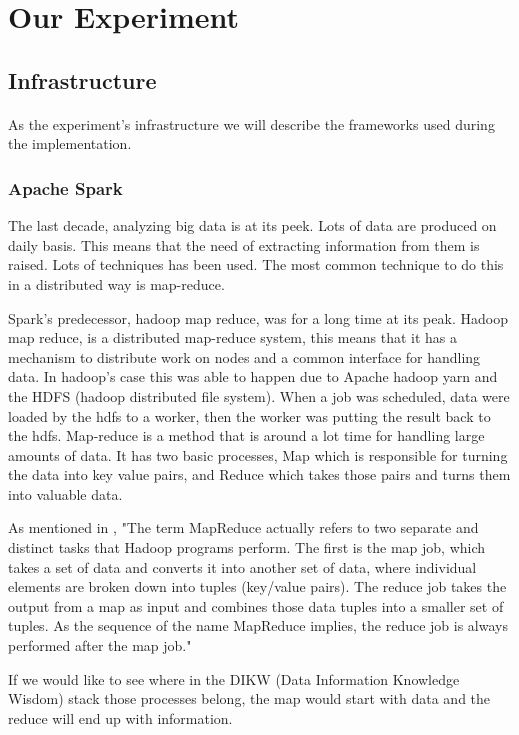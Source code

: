 \section{Our Experiment}
\subsection{Infrastructure}
\paragraph{}As the experiment's infrastructure we will describe the frameworks used during the implementation.
\subsubsection{Apache Spark}
The last decade, analyzing big data is at its peek. Lots of data are produced on daily basis. This means that the need of extracting information from them is raised. 
Lots of techniques has been used. The most common technique to do this in a distributed way is map-reduce.

Spark's predecessor, hadoop map reduce, was for a long time at its peak.
 Hadoop map reduce, is a distributed map-reduce system, 
this means that it has a mechanism to distribute work on nodes 
and a common interface for handling data. In hadoop's case this was able
 to happen due to Apache hadoop yarn and the HDFS (hadoop distributed file system).
 When a job was scheduled, data were loaded by the hdfs to a worker, 
then the worker was putting the result back to the hdfs. 
Map-reduce is a method that is around a lot time for handling large amounts of data. 
It has two basic processes, Map which is responsible for turning the data into key value pairs, and Reduce which takes those pairs and turns them into valuable data.

As mentioned in \cite{ibmMapReduce:5}, "The term MapReduce actually refers to two separate and distinct tasks that Hadoop programs perform. The first is the map job, which takes a set of data and converts it into another set of data, where individual elements are broken down into tuples (key/value pairs). The reduce job takes the output from a map as input and combines those data tuples into a smaller set of tuples. As the sequence of the name MapReduce implies, the reduce job is always performed after the map job."


If we would like to see where in the DIKW (Data Information Knowledge Wisdom) stack those processes belong, the map would start with data and the reduce will end up with information.



